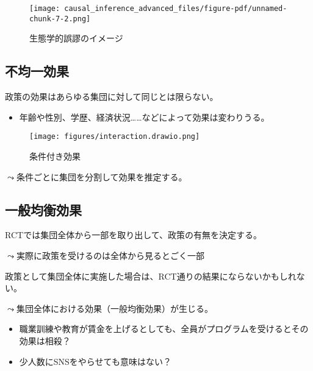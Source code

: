 \documentclass[
  xelatex,
  ja=standard]{bxjsarticle}
\providecommand{\tightlist}{%
  \setlength{\itemsep}{0pt}\setlength{\parskip}{0pt}}\usepackage{longtable,booktabs,array}
\begin{document}
\begin{figure}[htpb]

{\centering \texttt{[image: causal\_inference\_advanced\_files/figure-pdf/unnamed-chunk-7-2.png]}

}

\caption{生態学的誤謬のイメージ}

\end{figure}

\hypertarget{ux4e0dux5747ux4e00ux52b9ux679c}{%
\subsection{不均一効果}\label{ux4e0dux5747ux4e00ux52b9ux679c}}

政策の効果はあらゆる集団に対して同じとは限らない。

\begin{itemize}
\tightlist
\item
  年齢や性別、学歴、経済状況\ldots\ldots などによって効果は変わりうる。
\end{itemize}

\begin{figure}[htpb]

{\centering \texttt{[image: figures/interaction.drawio.png]}

}

\caption{条件付き効果}

\end{figure}

\(\leadsto\)条件ごとに集団を分割して効果を推定する。

\hypertarget{ux4e00ux822cux5747ux8861ux52b9ux679c}{%
\subsection{一般均衡効果}\label{ux4e00ux822cux5747ux8861ux52b9ux679c}}

RCTでは集団全体から一部を取り出して、政策の有無を決定する。

\(\leadsto\)実際に政策を受けるのは全体から見るとごく一部

政策として集団全体に実施した場合は、RCT通りの結果にならないかもしれない。

\(\leadsto\)集団全体における効果（一般均衡効果）が生じる。

\begin{itemize}
\tightlist
\item
  職業訓練や教育が賃金を上げるとしても、全員がプログラムを受けるとその効果は相殺？
\item
  少人数にSNSをやらせても意味はない？
\end{itemize}
\end{document}
